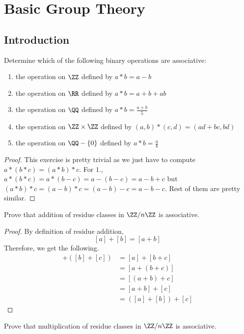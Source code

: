 \chapter{Basic Group Theory}

\section{Introduction}

\begin{problem}
    Determine which of the following binary operations are associative:
    \begin{enumerate}
        \item the operation on $\ZZ$ defined by $a*b = a - b$
        \item the operation on $\RR$ defined by $a*b = a + b + ab$
        \item the operation on $\QQ$ defined by $a*b = \frac{a+b}{5}$
        \item the operation on $\ZZ \times \ZZ$ defined by $(a,b)*(c,d) = (ad+bc, bd)$
        \item the operation on $\QQ-\{0\}$ defined by $a*b = \frac{a}{b}$
    \end{enumerate}
\end{problem}

\begin{proof}
    This exercise is pretty trivial as we just have to compute $a*(b*c)=(a*b)*c$.
    For $1.$, $a*(b*c)=a*(b-c)=a-(b-c)=a-b+c$ but $(a*b)*c=(a-b)*c=(a-b)-c=a-b-c$.
    Rest of them are pretty similar.
\end{proof}

\begin{problem}
    Prove that addition of residue classes in $\ZZ/n\ZZ$ is associative.
\end{problem}

\begin{proof}
    By definition of residue addition,
    \[ [a]+[b]= [a+b] \]
    Therefore, we get the following.
    \begin{align*}
        [a]+([b]+[c])&=[a]+[b+c]\\
        &= [a+(b+c)] \\
        &= [(a+b)+c] \\
        &= [a+b]+[c] \\
        &= ([a]+[b])+[c]
    \end{align*}
\end{proof}

\begin{problem}
    Prove that multiplication of residue classes in $\ZZ/n\ZZ$ is associative.
\end{problem}

